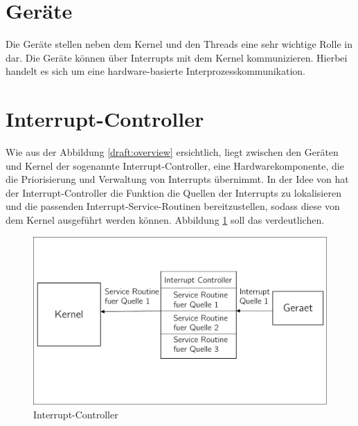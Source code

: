 \section{Ger\"ate}
Die Ger\"ate stellen neben dem Kernel und den Threads eine sehr wichtige Rolle in \mops dar. Die Ger\"ate k\"onnen \"uber Interrupts mit dem Kernel kommunizieren. Hierbei handelt es sich um eine hardware-basierte Interprozesskommunikation.
\section{Interrupt-Controller}
Wie aus der Abbildung \ref{draft:overview} ersichtlich, liegt zwischen den Ger\"aten und Kernel der sogenannte Interrupt-Controller, eine Hardwarekomponente, die die Priorisierung und Verwaltung von Interrupts \"ubernimmt. In der Idee von \mops hat der Interrupt-Controller die Funktion die Quellen der Interrupts zu lokalisieren und die passenden Interrupt-Service-Routinen bereitzustellen, sodass diese von dem Kernel ausgef\"uhrt werden k\"onnen. Abbildung \ref{draft:draft-vic} soll das verdeutlichen.
\begin{figure}[h!]
	\centering
	\includegraphics[scale=0.60]{common/draft-vic.pdf}	
	\caption{Interrupt-Controller}
	\label{draft:draft-vic}
\end{figure}
\newpage
